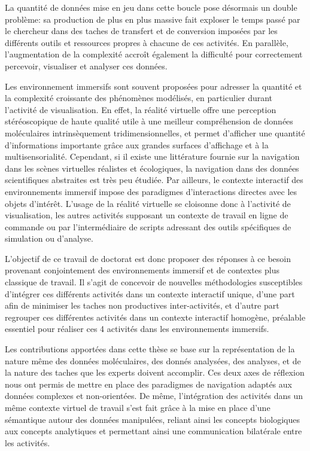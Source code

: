 La quantité de données mise en jeu dans cette boucle pose désormais un double problème: sa production de plus en plus massive fait exploser le temps passé par le chercheur dans des taches de transfert et de conversion imposées par les différents outils et ressources propres à chacune de ces activités. En parallèle, l'augmentation de la complexité accroît également la difficulté pour correctement percevoir, visualiser et analyser ces données.

Les environnement immersifs sont souvent proposées pour adresser la quantité et la complexité croissante des phénomènes modélisés, en particulier durant l'activité de visualisation. En effet, la réalité virtuelle offre une perception stéréoscopique de haute qualité utile à une meilleur compréhension de données moléculaires intrinsèquement tridimensionnelles, et permet d'afficher une quantité d'informations importante grâce aux grandes surfaces d'affichage et à la multisensorialité. Cependant, si il existe une littérature fournie sur la navigation dans les scènes virtuelles réalistes et écologiques, la navigation dans des données scientifiques abstraites est très peu étudiée. Par ailleurs, le contexte interactif des environnements immersif impose des paradigmes d'interactions directes avec les objets d'intérêt. L'usage de la réalité virtuelle se cloisonne donc à l'activité de visualisation, les autres activités supposant un contexte de travail en ligne de commande ou par l'intermédiaire de scripts adressant des outils spécifiques de simulation ou d'analyse.

L'objectif de ce travail de doctorat est donc proposer des réponses à ce besoin provenant conjointement des environnements immersif et de contextes plus classique de travail. Il s'agit de concevoir de nouvelles méthodologies susceptibles d'intégrer ces différents activités dans un contexte interactif unique, d'une part afin de minimiser les taches non productives inter-activités, et d'autre part regrouper ces différentes activités dans un contexte interactif homogène, préalable essentiel pour réaliser ces 4 activités dans les environnements immersifs.

Les contributions apportées dans cette thèse se base sur la représentation de la nature même des données moléculaires, des donnés analysées, des analyses, et de la nature des taches que les experts doivent accomplir. Ces deux axes de réflexion nous ont permis de mettre en place des paradigmes de navigation adaptés aux données complexes et non-orientées. De même, l'intégration des activités dans un même contexte virtuel de travail s'est fait grâce à la mise en place d'une sémantique autour des données manipulées, reliant ainsi les concepts biologiques aux concepts analytiques et permettant ainsi une communication bilatérale entre les activités.


